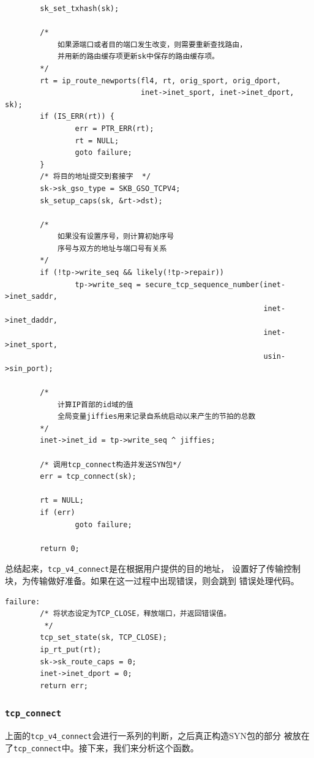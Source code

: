 \begin{verbatim}
        sk_set_txhash(sk);

        /*
			如果源端口或者目的端口发生改变，则需要重新查找路由，
			并用新的路由缓存项更新sk中保存的路由缓存项。
		*/
        rt = ip_route_newports(fl4, rt, orig_sport, orig_dport,
                               inet->inet_sport, inet->inet_dport, sk);
        if (IS_ERR(rt)) {
                err = PTR_ERR(rt);
                rt = NULL;
                goto failure;
        }
        /* 将目的地址提交到套接字  */
        sk->sk_gso_type = SKB_GSO_TCPV4;
        sk_setup_caps(sk, &rt->dst);

        /*  
			如果没有设置序号，则计算初始序号 
            序号与双方的地址与端口号有关系
        */
        if (!tp->write_seq && likely(!tp->repair))
                tp->write_seq = secure_tcp_sequence_number(inet->inet_saddr,
                                                           inet->inet_daddr,
                                                           inet->inet_sport,
                                                           usin->sin_port);
                                                           
        /*  
			计算IP首部的id域的值 
            全局变量jiffies用来记录自系统启动以来产生的节拍的总数       
        */
        inet->inet_id = tp->write_seq ^ jiffies;

        /* 调用tcp_connect构造并发送SYN包*/
        err = tcp_connect(sk);

        rt = NULL;
        if (err)
                goto failure;

        return 0;
\end{verbatim}

            总结起来，\texttt{tcp_v4_connect}是在根据用户提供的目的地址，
            设置好了传输控制块，为传输做好准备。如果在这一过程中出现错误，则会跳到
            错误处理代码。
\begin{verbatim}
failure:
        /* 将状态设定为TCP_CLOSE，释放端口，并返回错误值。
         */
        tcp_set_state(sk, TCP_CLOSE);
        ip_rt_put(rt);
        sk->sk_route_caps = 0;
        inet->inet_dport = 0;
        return err;
\end{verbatim}

        \subsubsection{\texttt{tcp_connect}}
			\label{Client:tcp_connect}
            上面的\texttt{tcp_v4_connect}会进行一系列的判断，之后真正构造SYN包的部分
            被放在了\texttt{tcp_connect}中。接下来，我们来分析这个函数。

